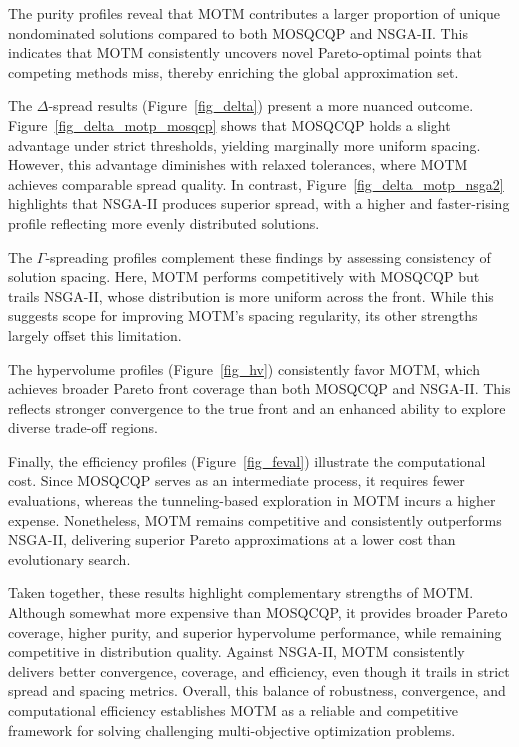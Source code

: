 \documentclass[amsa]{ipart}
\theoremstyle{plain}
\numberwithin{equation}{section}
\begin{document}
The purity profiles reveal that MOTM contributes a larger proportion of unique nondominated solutions compared to both MOSQCQP and NSGA-II. This indicates that MOTM consistently uncovers novel Pareto-optimal points that competing methods miss, thereby enriching the global approximation set.  

The $\Delta$-spread results (Figure~\ref{fig_delta}) present a more nuanced outcome. Figure~\ref{fig_delta_motp_mosqcp} shows that MOSQCQP holds a slight advantage under strict thresholds, yielding marginally more uniform spacing. However, this advantage diminishes with relaxed tolerances, where MOTM achieves comparable spread quality. In contrast, Figure~\ref{fig_delta_motp_nsga2} highlights that NSGA-II produces superior spread, with a higher and faster-rising profile reflecting more evenly distributed solutions.  

The $\Gamma$-spreading profiles complement these findings by assessing consistency of solution spacing. Here, MOTM performs competitively with \linebreak
MOSQCQP but trails NSGA-II, whose distribution is more uniform across the front. While this suggests scope for improving MOTM’s spacing regularity, its other strengths largely offset this limitation.  

The hypervolume profiles (Figure~\ref{fig_hv}) consistently favor MOTM, which achieves broader Pareto front coverage than both MOSQCQP and NSGA-II. This reflects stronger convergence to the true front and an enhanced ability to explore diverse trade-off regions.  

Finally, the efficiency profiles (Figure~\ref{fig_feval}) illustrate the computational cost. Since MOSQCQP serves as an intermediate process, it requires fewer evaluations, whereas the tunneling-based exploration in MOTM incurs a higher expense. Nonetheless, MOTM remains competitive and consistently outperforms NSGA-II, delivering superior Pareto approximations at a lower cost than evolutionary search.  

Taken together, these results highlight complementary strengths of MOTM. Although somewhat more expensive than MOSQCQP, it provides broader Pareto coverage, higher purity, and superior hypervolume performance, while remaining competitive in distribution quality. Against NSGA-II, MOTM consistently delivers better convergence, coverage, and efficiency, even though it trails in strict spread and spacing metrics. Overall, this balance of robustness, convergence, and computational efficiency establishes MOTM as a reliable and competitive framework for solving challenging multi-objective optimization problems.
\end{document}
